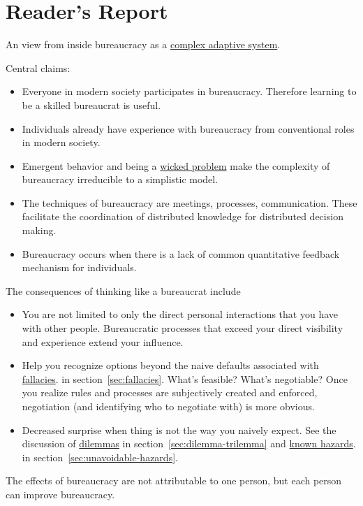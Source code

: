 \section{Reader's Report\label{sec:reader-report}}
An view from inside bureaucracy as a \href{https://en.wikipedia.org/wiki/Complexity_theory_and_organizations}{complex adaptive system}. 

Central claims:
\begin{itemize}
    \item Everyone in modern society participates in bureaucracy. Therefore learning to be a skilled bureaucrat is useful.
    \item Individuals already have experience with bureaucracy from conventional roles in modern society. 
    \item Emergent behavior and being a \href{https://en.wikipedia.org/wiki/Wicked_problem}{wicked problem} make the complexity of bureaucracy irreducible to a simplistic model.
    \item The techniques of bureaucracy are meetings, processes, communication. These facilitate the coordination of distributed knowledge for distributed decision making.  
    \item Bureaucracy occurs when there is a lack of common quantitative feedback mechanism for individuals.
\end{itemize}
The consequences of thinking like a bureaucrat include
\begin{itemize}
    \item You are not limited to only the direct personal interactions that you have with other people. Bureaucratic processes that exceed your direct visibility and experience extend your influence.
    \item Help you recognize options beyond the naive defaults associated with \hyperref[sec:fallacies]{fallacies}.
    \ifsectionref
    in section~\ref{sec:fallacies}. 
    \fi
    What's feasible? What's negotiable? Once you realize rules and processes are subjectively created and enforced, negotiation (and identifying who to negotiate with) is more obvious.
    \item Decreased surprise when thing is not the way you naively expect. See the discussion of \hyperref[sec:dilemma-trilemma]{dilemmas}
    \ifsectionref
    in section~\ref{sec:dilemma-trilemma} 
    \fi
    and 
    \hyperref[sec:unavoidable-hazards]{known hazards}.
    \ifsectionref
    in section~\ref{sec:unavoidable-hazards}.
    \fi
\end{itemize}


The effects of bureaucracy are not attributable to one person, but each person can improve bureaucracy.